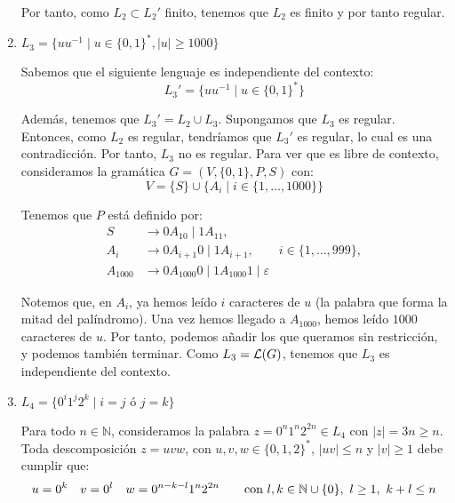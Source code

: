 \begin{ejercicio}
\begin{enumerate}
        Por tanto, como $L_2\subset L_2'$ finito, tenemos que $L_2$ es finito y por tanto regular.

        \item $L_3=\{uu^{-1} \mid u \in {\{0,1\}}^\ast, |u|\geq 1000\}$
        
        Sabemos que el siguiente lenguaje es independiente del contexto:
        \begin{equation*}
            L_3' = \{uu^{-1} \mid u \in {\{0,1\}}^\ast\}
        \end{equation*}

        Además, tenemos que $L_3'=L_2\cup L_3$. Supongamos que $L_3$ es regular. Entonces, como $L_2$ es regular, tendríamos que $L_3'$ es regular, lo cual es una contradicción. Por tanto, $L_3$ no es regular.
        Para ver que es libre de contexto, consideramos la gramática $G=(V,\{0,1\},P,S)$ con:
        \begin{equation*}
            V=\{S\}\cup \{A_i\mid i\in \{1,\dots,1000\}\}
        \end{equation*}

        Tenemos que $P$ está definido por:
        \begin{align*}
            S &\rightarrow 0A_10 \mid 1A_11, \\
            A_i &\rightarrow 0A_{i+1}0 \mid 1A_{i+1},\qquad i\in \{1,\dots,999\},\\
            A_{1000} &\rightarrow 0A_{1000}0 \mid 1A_{1000}1 \mid \varepsilon
        \end{align*}

        Notemos que, en $A_i$, ya hemos leído $i$ caracteres de $u$ (la palabra que forma la mitad del palíndromo).
        Una vez hemos llegado a $A_{1000}$, hemos leído $1000$ caracteres de $u$. Por tanto, podemos añadir los que queramos sin restricción, y podemos también terminar.
        Como $L_3=\mathcal{L}(G)$, tenemos que $L_3$ es independiente del contexto.
        
        \item $L_4=\{0^i 1^j 2^k \mid i = j \text{\ ó\ } j=k\}$
        
        Para todo $n\in \mathbb{N}$, consideramos la palabra $z=0^n1^n2^{2n}\in L_4$ con $|z|=3n\geq n$. Toda descomposición $z=uvw$, con $u,v,w\in \{0,1,2\}^\ast$, $|uv|\leq n$ y $|v|\geq 1$ debe cumplir que:
        \begin{equation*}
            u=0^k \quad v=0^l \quad w=0^{n-k-l}1^n2^{2n} \qquad \text{con } l,k\in \mathbb{N}\cup \{0\},~l\geq 1,~k+l\leq n
        \end{equation*}


\end{enumerate}
\end{ejercicio}
